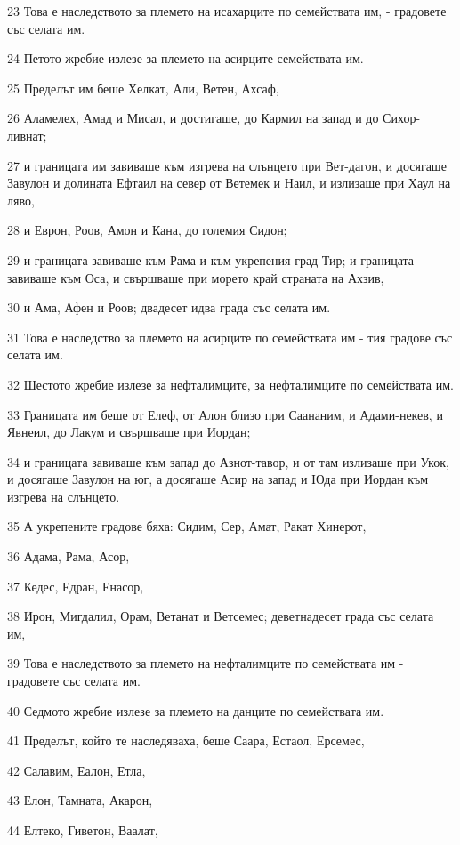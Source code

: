 \par 23 Това е наследството за племето на исахарците по семействата им, - градовете със селата им.
\par 24 Петото жребие излезе за племето на асирците семействата им.
\par 25 Пределът им беше Хелкат, Али, Ветен, Ахсаф,
\par 26 Аламелех, Амад и Мисал, и достигаше, до Кармил на запад и до Сихор-ливнат;
\par 27 и границата им завиваше към изгрева на слънцето при Вет-дагон, и досягаше Завулон и долината Ефтаил на север от Ветемек и Наил, и излизаше при Хаул на ляво,
\par 28 и Еврон, Роов, Амон и Кана, до големия Сидон;
\par 29 и границата завиваше към Рама и към укрепения град Тир; и границата завиваше към Оса, и свършваше при морето край страната на Ахзив,
\par 30 и Ама, Афен и Роов; двадесет идва града със селата им.
\par 31 Това е наследство за племето на асирците по семействата им - тия градове със селата им.
\par 32 Шестото жребие излезе за нефталимците, за нефталимците по семействата им.
\par 33 Границата им беше от Елеф, от Алон близо при Саананим, и Адами-некев, и Явнеил, до Лакум и свършваше при Иордан;
\par 34 и границата завиваше към запад до Азнот-тавор, и от там излизаше при Укок, и досягаше Завулон на юг, а досягаше Асир на запад и Юда при Иордан към изгрева на слънцето.
\par 35 А укрепените градове бяха: Сидим, Сер, Амат, Ракат Хинерот,
\par 36 Адама, Рама, Асор,
\par 37 Кедес, Едран, Енасор,
\par 38 Ирон, Мигдалил, Орам, Ветанат и Ветсемес; деветнадесет града със селата им,
\par 39 Това е наследството за племето на нефталимците по семействата им - градовете със селата им.
\par 40 Седмото жребие излезе за племето на данците по семействата им.
\par 41 Пределът, който те наследяваха, беше Саара, Естаол, Ерсемес,
\par 42 Салавим, Еалон, Етла,
\par 43 Елон, Тамната, Акарон,
\par 44 Елтеко, Гиветон, Ваалат,
